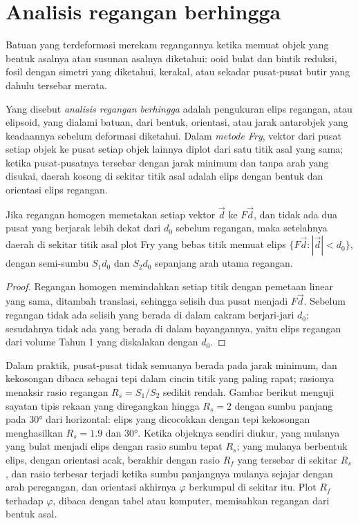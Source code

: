 \section{Analisis regangan berhingga}\label{sec:b3:structural-analysis:strain}

Batuan yang terdeformasi merekam regangannya ketika memuat objek yang bentuk asalnya
atau susunan asalnya diketahui: ooid bulat dan bintik reduksi,
fosil dengan simetri yang diketahui, kerakal, atau sekadar pusat-pusat butir
yang dahulu tersebar merata.

\begin{definition}\label{def:b3:structural-analysis:strain-analysis}
Yang disebut \emph{analisis regangan berhingga} adalah pengukuran
elips regangan, atau elipsoid, yang dialami batuan, dari
bentuk, orientasi, atau jarak antarobjek yang keadaannya sebelum
deformasi diketahui. Dalam \emph{metode Fry}, vektor
dari pusat setiap objek ke pusat setiap objek lainnya diplot dari
satu titik asal yang sama; ketika pusat-pusatnya tersebar dengan jarak minimum dan tanpa
arah yang disukai, daerah kosong di sekitar titik asal adalah elips dengan
bentuk dan orientasi elips regangan.
\end{definition}

\begin{proposition}\label{prop:b3:structural-analysis:fry}
Jika regangan homogen memetakan setiap vektor $\vec d$ ke $F\vec d$, dan tidak ada dua
pusat yang berjarak lebih dekat dari $d_0$ sebelum regangan, maka setelahnya daerah
di sekitar titik asal plot Fry yang bebas titik memuat elips
$\{F\vec d : |\vec d| < d_0\}$, dengan semi-sumbu $S_1d_0$ dan $S_2d_0$ sepanjang
arah utama regangan.
\end{proposition}

\begin{proof}
Regangan homogen memindahkan setiap titik dengan pemetaan linear yang sama, ditambah
translasi, sehingga selisih dua pusat menjadi $F\vec d$. Sebelum
regangan tidak ada selisih yang berada di dalam cakram berjari-jari $d_0$; sesudahnya tidak ada yang berada di dalam
bayangannya, yaitu elips regangan dari volume Tahun 1 yang diskalakan dengan $d_0$.
\end{proof}

Dalam praktik, pusat-pusat tidak semuanya berada pada jarak minimum, dan kekosongan
dibaca sebagai tepi dalam cincin titik yang paling rapat; rasionya menaksir
rasio regangan $R_s = S_1/S_2$ sedikit rendah. Gambar berikut menguji
sayatan tipis rekaan yang diregangkan hingga $R_s = 2$ dengan sumbu panjang pada
\ang{30} dari horizontal: elips yang dicocokkan dengan tepi kekosongan menghasilkan
$R_s = 1.9$ dan \ang{30}. Ketika objeknya sendiri diukur, yang mulanya
yang bulat menjadi elips dengan rasio sumbu tepat $R_s$; yang mulanya
berbentuk elips, dengan orientasi acak, berakhir dengan rasio $R_f$ yang tersebar
di sekitar $R_s$, dan rasio terbesar terjadi ketika sumbu panjangnya mulanya sejajar dengan
arah peregangan, dan orientasi akhirnya $\varphi$ berkumpul di sekitar
itu. Plot $R_f$ terhadap $\varphi$, dibaca dengan tabel atau komputer,
memisahkan regangan dari bentuk asal.

